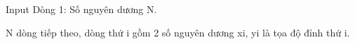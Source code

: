 Input  
Dòng 1: Số nguyên dương N.  

   N dòng tiếp theo, dòng thứ i gồm 2 số nguyên dương xi, yi là tọa độ đỉnh thứ i.
